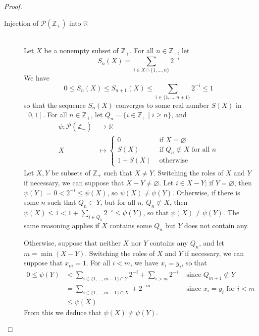 \documentclass[11pt,a4paper,twoside]{article}
\theoremstyle{definition}
\begin{document}
\begin{proof}
\begin{description}
    \item[Injection of $\mathscr{P} ( \mathbb{Z}_+ )$ into $\mathbb{R}$] \hspace{0pt}\\
      Let $X$ be a nonempty subset of $\mathbb{Z}_+$. For all $n \in \mathbb{Z}_+$, let
      \begin{equation*}
        S_n ( X ) = \sum_{i \in X \cap \{ 1, \dotsc, n \}} 2^{- i}
      \end{equation*}
      We have
      \begin{equation*}
        0 \leq S_n ( X ) \leq S_{n + 1} ( X ) \leq \sum_{i \in \{ 1, \dotsc, n + 1 \}} 2^{- i} \leq 1
      \end{equation*}
      so that the sequence $S_n ( X )$ converges to some real number $S ( X )$ in $[ 0, 1 ]$.
      For all $n \in \mathbb{Z}_+$, let $Q_n = \{ i \in \mathbb{Z}_+ \mid i \geq n \}$, and
      \begin{align*}
        \psi : \mathscr{P} ( \mathbb{Z}_+ ) &\to \mathbb{R} \\
        X &\mapsto \begin{cases}
          0 &\text{ if } X = \varnothing \\
          S ( X ) &\text{ if } Q_n \not\subset X \text{ for all } n \\
          1 + S ( X ) &\text{ otherwise }
        \end{cases}
      \end{align*}
      Let $X, Y$ be subsets of $\mathbb{Z}_+$ such that $X \neq Y$. Switching the roles of $X$ and $Y$ if necessary,
      we can suppose that $X - Y \neq \varnothing$. Let $i \in X - Y$; if $Y = \varnothing$, then $\psi ( Y ) = 0 < 2^{- i} \leq \psi ( X )$,
      so $\psi ( X ) \neq \psi ( Y )$. Otherwise, if there is some $n$ such that $Q_n \subset Y$, but for all $n$, $Q_n \not\subset X$, then
      $\psi ( X ) \leq 1 < 1 + \sum_{i \in Q_n} 2^{- i} \leq \psi ( Y )$, so that $\psi ( X ) \neq \psi ( Y )$.
      The same reasoning applies if $X$ contains some $Q_n$ but $Y$ does not contain any.

      Otherwise, suppose that neither $X$ nor $Y$ contains any $Q_n$, and let $m = \min ( X - Y )$.
      Switching the roles of $X$ and $Y$ if necessary, we can suppose that $x_m = 1$. For all $i < m$, we have $x_i = y_i$, so that
      \begin{align*}
        0 \leq \psi ( Y ) &< \sum_{i \in \{ 1, \dotsc, m - 1 \} \cap Y} 2^{- i} + \sum_{i > m} 2^{- i} &\text{ since } Q_{m + 1} \not\subset Y \\
        &= \sum_{i \in \{ 1, \dotsc, m - 1 \} \cap X} + 2^{- m} &\text{ since } x_i = y_i \text{ for } i < m \\
        &\leq \psi ( X )
      \end{align*}
      From this we deduce that $\psi ( X ) \neq \psi ( Y )$.


\end{description}
\end{proof}
\end{document}

